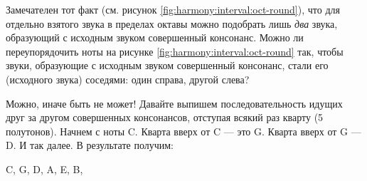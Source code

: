 Замечателен тот факт (см. рисунок \ref{fig:harmony:interval:oct-round}), что для отдельно взятого звука в пределах октавы можно подобрать лишь \emph{два} звука, образующий с исходным звуком совершенный консонанс. Можно ли переупорядочить ноты на рисунке \ref{fig:harmony:interval:oct-round} так, чтобы звуки, образующие с исходным звуком совершенный консонанс, стали его (исходного звука) соседями: один справа, другой слева?

Можно, иначе быть не может! Давайте выпишем последовательность идущих друг за другом совершенных консонансов, отступая всякий раз кварту (5 полутонов). Начнем с ноты C. Кварта вверх от C --- это G. Кварта вверх от G --- D. И так далее. В результате получим:
\begin{center}
    C, G, D, A, E, B, 
\end{center}